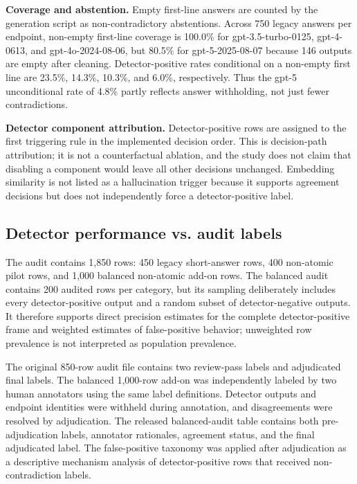 \documentclass[11pt]{article}
\begin{document}
\textbf{Coverage and abstention.} Empty first-line answers are counted by the generation script as non-contradictory abstentions. Across 750 legacy answers per endpoint, non-empty first-line coverage is 100.0\% for gpt-3.5-turbo-0125, gpt-4-0613, and gpt-4o-2024-08-06, but 80.5\% for gpt-5-2025-08-07 because 146 outputs are empty after cleaning. Detector-positive rates conditional on a non-empty first line are 23.5\%, 14.3\%, 10.3\%, and 6.0\%, respectively. Thus the gpt-5 unconditional rate of 4.8\% partly reflects answer withholding, not just fewer contradictions.

\textbf{Detector component attribution.} Detector-positive rows are assigned to the first triggering rule in the implemented decision order. This is decision-path attribution; it is not a counterfactual ablation, and the study does not claim that disabling a component would leave all other decisions unchanged. Embedding similarity is not listed as a hallucination trigger because it supports agreement decisions but does not independently force a detector-positive label.


\subsection*{Detector performance vs. audit labels}
The audit contains 1,850 rows: 450 legacy short-answer rows, 400 non-atomic pilot rows, and 1,000 balanced non-atomic add-on rows. The balanced audit contains 200 audited rows per category, but its sampling deliberately includes every detector-positive output and a random subset of detector-negative outputs. It therefore supports direct precision estimates for the complete detector-positive frame and weighted estimates of false-positive behavior; unweighted row prevalence is not interpreted as population prevalence.

The original 850-row audit file contains two review-pass labels and adjudicated final labels. The balanced 1,000-row add-on was independently labeled by two human annotators using the same label definitions. Detector outputs and endpoint identities were withheld during annotation, and disagreements were resolved by adjudication. The released balanced-audit table contains both pre-adjudication labels, annotator rationales, agreement status, and the final adjudicated label. The false-positive taxonomy was applied after adjudication as a descriptive mechanism analysis of detector-positive rows that received non-contradiction labels.
\end{document}
